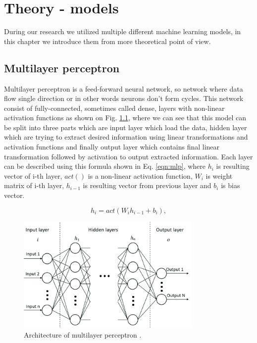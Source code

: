 
\chapter{Theory - models}
\label{chap:thoery}

During our research we utilized multiple different machine learning models, in this chapter we introduce them from more theoretical point of view.

\section{Multilayer perceptron}
\label{MLP}

Multilayer perceptron is a feed-forward neural network, so network where data flow single direction or in other words neurons don't form cycles. This network consist of fully-connected, sometimes called dense, layers with non-linear activation functions as shown on Fig. \ref{fig:mlp}, where we can see that this model can be split into three parts which are input layer which load the data, hidden layer which are trying to extract desired information using linear transformations and activation functions and finally output layer which contains final linear transformation followed by activation to output extracted information. Each layer can be described using this formula shown in Eq. \ref{eqn:mlp}, where $h_i$ is resulting vector of i-th layer, $act()$ is a non-linear activation function, $W_i$ is weight matrix of i-th layer, $h_{i-1}$ is resulting vector from previous layer and $b_i$ is bias vector. 

\begin{equation}
	\label{eqn:mlp}
	h_i = act(W_i h_{i-1} + b_i),
\end{equation}

\begin{figure}[!h]
	\centering
	
	\includegraphics[width=0.8\textwidth]{images/MLP_arch.png}
	
	\caption{Architecture of multilayer perceptron \cite{MLParch}.}
	\label{fig:mlp}
\end{figure} 

